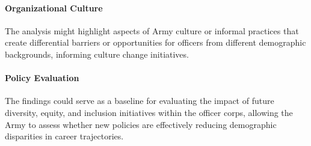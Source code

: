 \documentclass[../main.tex]{subfiles}
\begin{document}
\paragraph{Organizational Culture}
The analysis might highlight aspects of Army culture or informal practices that create differential barriers or opportunities for officers from different demographic backgrounds, informing culture change initiatives.

\paragraph{Policy Evaluation}
The findings could serve as a baseline for evaluating the impact of future diversity, equity, and inclusion initiatives within the officer corps, allowing the Army to assess whether new policies are effectively reducing demographic disparities in career trajectories.

\end{document}

